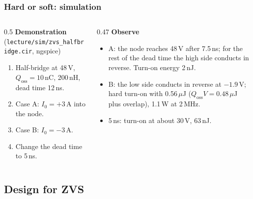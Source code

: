 \begin{frame}
	\frametitle{Hard or soft: simulation}
	\begin{columns}[T]
		\begin{column}{0.5\textwidth}
			\textbf{Demonstration} (\texttt{lecture/sim/zvs\_halfbridge.cir}, ngspice)
			\begin{enumerate}
				\item Half-bridge at 48\,V, $Q_\mathrm{oss}=10$\,nC, 200\,nH, dead time 12\,ns.
				\item Case A: $I_0=+3$\,A into the node.
				\item Case B: $I_0=-3$\,A.
				\item Change the dead time to 5\,ns.
			\end{enumerate}
		\end{column}
		\begin{column}{0.47\textwidth}
			\textbf{Observe}
			\begin{itemize}
				\item A: the node reaches 48\,V after 7.5\,ns; for the rest of the dead time the high side conducts in reverse. Turn-on energy 2\,nJ.
				\item B: the low side conducts in reverse at $-1.9$\,V; hard turn-on with 0.56\,$\mu$J ($Q_\mathrm{oss}V=0.48\,\mu$J plus overlap), 1.1\,W at 2\,MHz.
				\item 5\,ns: turn-on at about 30\,V, 63\,nJ.
			\end{itemize}
		\end{column}
	\end{columns}
\end{frame}

\subsection{Design for ZVS}

